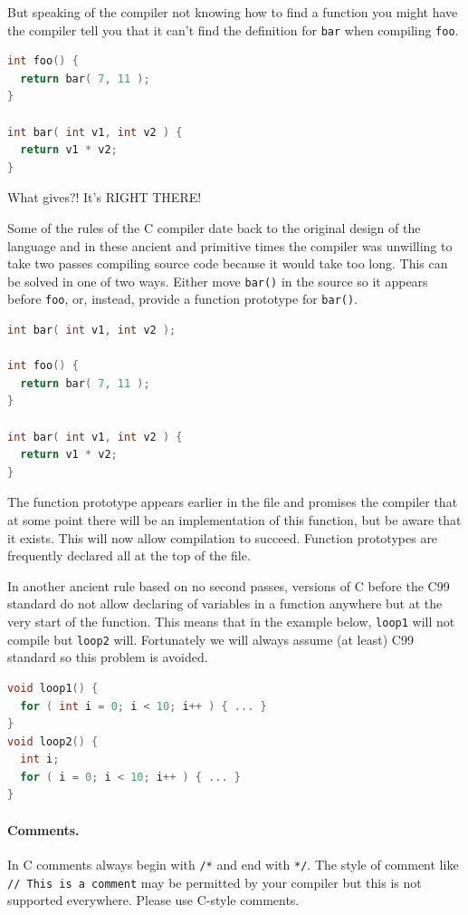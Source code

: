 \documentclass[a4paper]{report}
\begin{document}
But speaking of the compiler not knowing how to find a function you might have the compiler tell you that it can't find the definition for \texttt{bar} when compiling \texttt{foo}.

\begin{lstlisting}[language=C]
int foo() {
  return bar( 7, 11 );
}

int bar( int v1, int v2 ) {
  return v1 * v2;
} 
\end{lstlisting}

What gives?! It's RIGHT THERE!

Some of the rules of the C compiler date back to the original design of the language and in these ancient and primitive times the compiler was unwilling to take two passes compiling source code because it would take too long. This can be solved in one of two ways. Either move \texttt{bar()} in the source so it appears before \texttt{foo}, or, instead, provide a function prototype for \texttt{bar()}.

\begin{lstlisting}[language=C]
int bar( int v1, int v2 );

int foo() {
  return bar( 7, 11 );
}

int bar( int v1, int v2 ) {
  return v1 * v2;
} 
\end{lstlisting}

The function prototype appears earlier in the file and promises the compiler that at some point there will be an implementation of this function, but be aware that it exists. This will now allow compilation to succeed. Function prototypes are frequently declared all at the top of the file.

In another ancient rule based on no second passes, versions of C before the C99 standard do not allow declaring of variables in a function anywhere but at the very start of the function. This means that in the example below, \texttt{loop1} will not compile but \texttt{loop2} will.  Fortunately we will always assume (at least) C99 standard so this problem is avoided.

\begin{lstlisting}[language=C]
void loop1() {
  for ( int i = 0; i < 10; i++ ) { ... }
}
void loop2() {
  int i;
  for ( i = 0; i < 10; i++ ) { ... }
}
\end{lstlisting}

\paragraph{Comments.} In C comments always begin with \texttt{/*} and end with \texttt{*/}. The style of comment like \texttt{// This is a comment} may be permitted by your compiler but this is not supported everywhere. Please use C-style comments.
\end{document}
